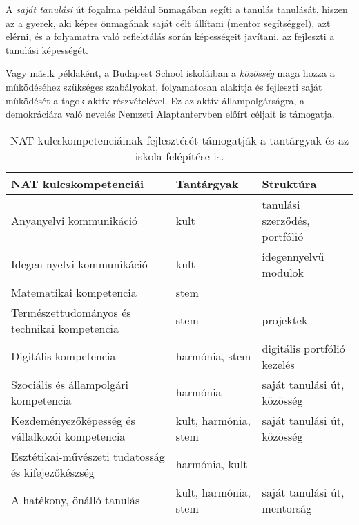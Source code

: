 A \emph{saját tanulási} út fogalma például önmagában segíti a tanulás
tanulását, hiszen az a gyerek, aki képes önmagának saját célt állítani (mentor
segítséggel), azt elérni, és a folyamatra való reflektálás során képességeit
javítani, az fejleszti a tanulási képességét.

Vagy másik példaként, a Budapest School iskoláiban a \emph{közösség} maga hozza
a működéséhez szükséges szabályokat, folyamatosan alakítja és fejleszti saját
működését a tagok aktív részvételével. Ez az aktív állampolgárságra, a
demokráciára való nevelés Nemzeti Alaptantervben előírt céljait is támogatja.

\begin{table}
  \centering
  \begin{tabular}{p{5cm}|>{\raggedright}p{3cm}|p{3cm}}

    \textbf{NAT kulcskompetenciái}                     & \textbf{Tantárgyak}  &
    \textbf{Struktúra}                                                                                        \\ \hline
    Anyanyelvi kommunikáció                            & kult                 & tanulási szerződés, portfólió \\ \hline
    Idegen nyelvi kommunikáció                         & kult                 & idegennyelvű modulok          \\ \hline
    Matematikai kompetencia                            & stem                 &                               \\ \hline
    Természettudományos és technikai kompetencia       & stem                 & projektek                     \\ \hline
    Digitális kompetencia                              & harmónia, stem       & digitális portfólió kezelés   \\ \hline
    Szociális és állampolgári kompetencia              & harmónia             & saját tanulási út,
    közösség                                                                                                  \\ \hline
    Kezdeményezőképesség és vállalkozói kompetencia    & kult, harmónia, stem & saját
    tanulási út, közösség                                                                                     \\ \hline
    Esztétikai-művészeti tudatosság és kifejezőkészség & harmónia, kult       &                               \\ \hline
    A hatékony, önálló tanulás                         & kult, harmónia, stem & saját tanulási út,
    mentorság                                                                                                 \\

  \end{tabular}
  \caption{NAT kulcskompetenciáinak fejlesztését támogatják a tantárgyak és
    az iskola felépítése is.}
  \label{tbl:nat_kulcs}
\end{table}